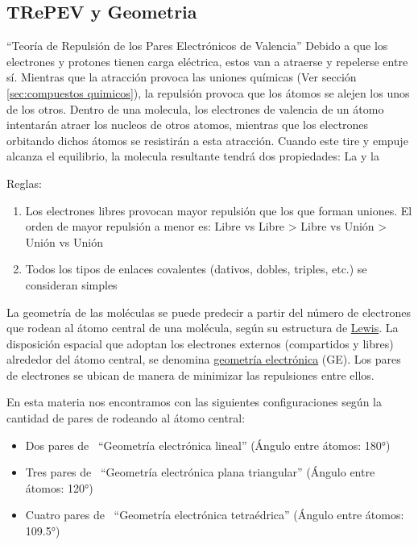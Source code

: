 \documentclass[../Teoría.root.tex]{subfiles}
\begin{document}
\subsection{TRePEV y Geometria}
“Teoría de Repulsión de los Pares Electrónicos de Valencia”
Debido a que los electrones y protones tienen carga eléctrica, estos van a atraerse y repelerse entre sí. Mientras que la atracción provoca las uniones químicas (Ver sección \ref{sec:compuestos quimicos}), la repulsión provoca que los átomos se alejen los unos de los otros. Dentro de una molecula, los electrones de valencia de un átomo intentarán atraer los nucleos de otros atomos, mientras que los electrones orbitando dichos átomos se resistirán a esta atracción. Cuando este tire y empuje alcanza el equilibrio, la molecula resultante tendrá dos propiedades: La  y la 

Reglas:
\label{lst:representaciones.reglas}
\begin{enumerate}
    \item Los electrones libres provocan mayor repulsión que los que forman uniones. El orden de mayor repulsión a menor es: Libre vs Libre > Libre vs Unión > Unión vs Unión
    \item Todos los tipos de enlaces covalentes (dativos, dobles, triples, etc.) se consideran simples
\end{enumerate}

La geometría de las moléculas se puede predecir a partir del número de electrones que rodean al átomo central de una molécula, según su estructura de \hyperref[sec:lewis]{Lewis}. La disposición espacial que adoptan los electrones externos (compartidos y libres) alrededor del átomo central, se denomina \underline{geometría electrónica} (GE). Los pares de electrones se ubican de manera de minimizar las repulsiones entre ellos.

En esta materia nos encontramos con las siguientes configuraciones según la cantidad de pares de  rodeando al átomo central:
\begin{itemize}
    \item Dos pares de  \rightarrow\ “Geometría electrónica lineal” (Ángulo entre átomos: \ang{180})

    \item Tres pares de  \rightarrow\ “Geometría electrónica plana triangular” (Ángulo entre átomos: \ang{120})

    \item Cuatro pares de  \rightarrow\ “Geometría electrónica tetraédrica” (Ángulo entre átomos: \ang{109.5})

\end{itemize}
\end{document}
